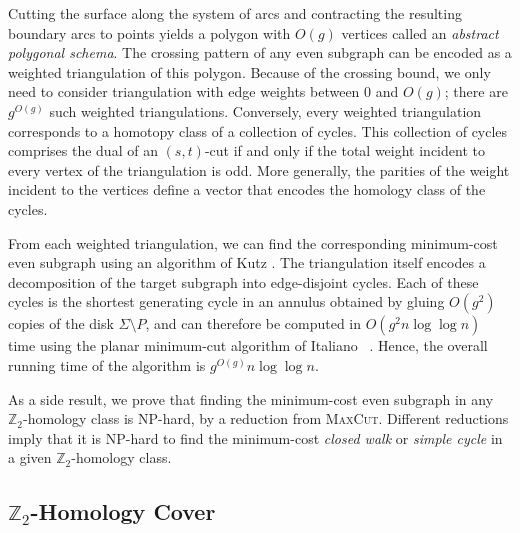 \documentclass[natbib]{svcyclop}
\def\Z{\mathbb{Z}}
\begin{document}
Cutting the surface along the system of arcs and contracting the resulting boundary arcs to points yields a polygon with $O(g)$ vertices called an \emph{abstract polygonal schema}.
The crossing pattern of any even subgraph can be encoded as a weighted triangulation of this polygon.  Because of the crossing bound, we only need to consider triangulation with edge weights between $0$ and $O(g)$; there are $g^{O(g)}$ such weighted triangulations.
Conversely, every weighted triangulation corresponds to a homotopy class of a collection of cycles.  This collection of cycles comprises the dual of an $(s,t)$-cut if and only if the total weight incident to every vertex of the triangulation is odd.  More generally, the parities of the weight incident to the vertices define a vector that encodes the homology class of the cycles.

From each weighted triangulation, we can find the corresponding minimum-cost even subgraph using an algorithm of Kutz \cite{k-csnco-06}.  The triangulation itself encodes a decomposition of the target subgraph into edge-disjoint cycles.  Each of these cycles is the shortest generating cycle in an annulus obtained by gluing $O(g^2)$ copies of the disk $\Sigma\setminus P$, and can therefore be computed in $O(g^2n\log\log n)$ time using the planar minimum-cut algorithm of Italiano \etal~\cite{insw-iamcmf-11}.
Hence, the overall running time of the algorithm is $g^{O(g)}n\log\log n$.

As a side result, we prove that finding the minimum-cost even subgraph in any $\Z_2$-homology class is NP-hard, by a reduction from \textsc{MaxCut}.  Different reductions imply that it is NP-hard to find the minimum-cost \emph{closed walk} \cite{splitting} or \emph{simple cycle}
\cite{ccl-fctpe-11} in a given $\Z_2$-homology class.

\subsection{$\Z_2$-Homology Cover}
\end{document}
